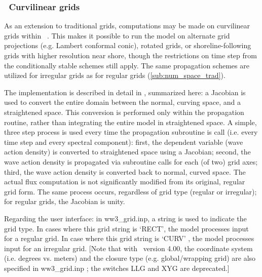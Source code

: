 \vssub
\subsubsection{~Curvilinear grids} \label{sub:num_space_curv}

\noindent 
As an extension to traditional grids, computations may be made on curvilinear
grids within \ws\ . This makes it possible to run the model on alternate grid
projections (e.g. Lambert conformal conic), rotated grids, or
shoreline-following grids with higher resolution near shore, though the
restrictions on time step from the conditionally stable schemes still
apply. The same propagation schemes are utilized for irregular grids as for
regular grids (\para\ref{sub:num_space_trad}).

The implementation is described in detail in \citep{rep:RC09}, summarized
here: a Jacobian is used to convert the entire domain between the normal,
curving space, and a straightened space. This conversion is performed only
within the propagation routine, rather than integrating the entire model in
straightened space. A simple, three step process is used every time the
propagation subroutine is call (i.e. every time step and every spectral
component): first, the dependent variable (wave action density) is converted
to straightened space using a Jacobian; second, the wave action density is
propagated via subroutine calls for each (of two) grid axes; third, the wave
action density is converted back to normal, curved space. The actual flux
computation is not significantly modified from its original, regular grid
form. The same process occurs, regardless of grid type (regular or irregular);
for regular grids, the Jacobian is unity.

Regarding the user interface: in {\file ww3\_grid.inp}, a string is used to
indicate the grid type. In cases where this grid string is `{\code RECT}', the
model processes input for a regular grid. In case where this grid string is
`{\code CURV}' , the model processes input for an irregular grid. [Note that
with \ws\ version 4.00, the coordinate system (i.e. degrees vs. meters) and
the closure type (e.g. global/wrapping grid) are also specified in {\file
ww3\_grid.inp} ; the switches {\code LLG} and {\code XYG} are deprecated.]
